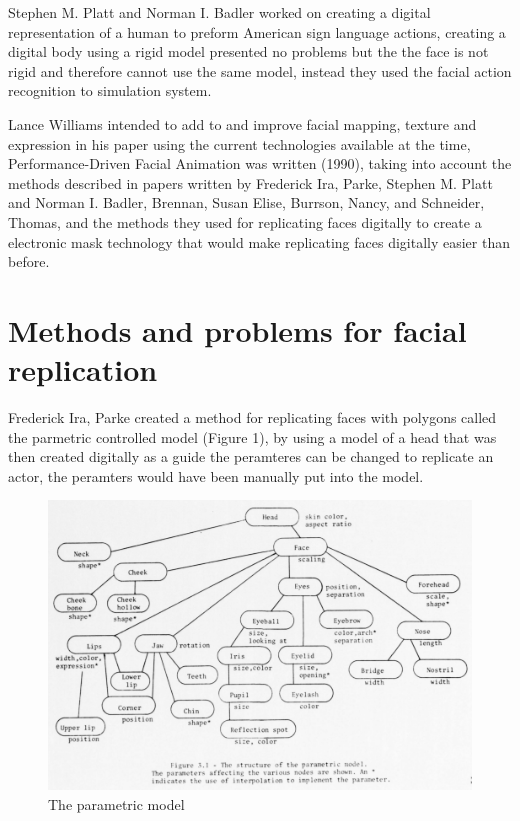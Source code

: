 \documentclass{scrartcl}
\begin{document}
Stephen M. Platt and Norman I. Badler worked on creating a digital representation of a human to preform American sign language actions, creating a digital body using a rigid model presented no problems but the the face is not rigid and therefore cannot use the same model, instead they used the facial action recognition to simulation system\cite{platt1981animating}.

Lance Williams intended to add to and improve facial mapping, texture and expression in his paper using the current technologies available at the time, Performance-Driven Facial Animation was written (1990), taking into account the methods described in papers written by Frederick Ira, Parke\cite{parke1974parametric}, Stephen M. Platt and Norman I. Badler\cite{platt1981animating}, Brennan, Susan Elise\cite{brennan1982caricature}, Burrson, Nancy, and Schneider, Thomas\cite{burson1981method}, and the methods they used for replicating faces digitally to create a electronic mask technology that would make replicating faces digitally easier than before\cite{williams1990performance}.

\section{Methods and problems for facial replication}

Frederick Ira, Parke created a method for replicating faces with polygons called the parmetric controlled model (Figure 1), by using a model of a head that was then created digitally as a guide the peramteres can be changed to replicate an actor, the peramters would have been manually put into the model.

\begin{figure}[h]
\includegraphics[width=12cm]{Parametric.png}
\caption{The parametric model \cite{parke1974parametric}}
\label{fig:Model1}
\end{figure}
\end{document}
